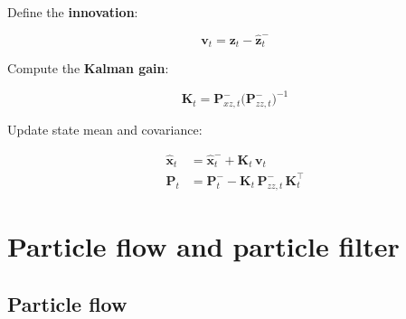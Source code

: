 \documentclass{article}
\renewcommand{\v}[1]{ \ensuremath{ {\mathbf{#1}} }}
\begin{document}
Define the \textbf{innovation}:

\begin{equation}
\v v_t = \v z_t - \hat{\v z}_{t}^{-}
\end{equation}

Compute the \textbf{Kalman gain}:

\begin{equation}
\v K_t = \v P_{xz,t}^{-} \bigl( \v P_{zz,t}^{-} \bigr)^{-1}
\end{equation}

Update state mean and covariance:

\begin{align}
\hat{\v x}_{t} &= \hat{\v x}_{t}^{-} + \v K_t \, \v v_t \\
\v P_{t} &= \v P_{t}^{-} - \v K_t \, \v P_{zz,t}^{-} \, \v K_t^\top
\end{align}



\newpage 

\section{Particle flow and particle filter}

\subsection{Particle flow}\label{APP:Particle_flow}
\end{document}
